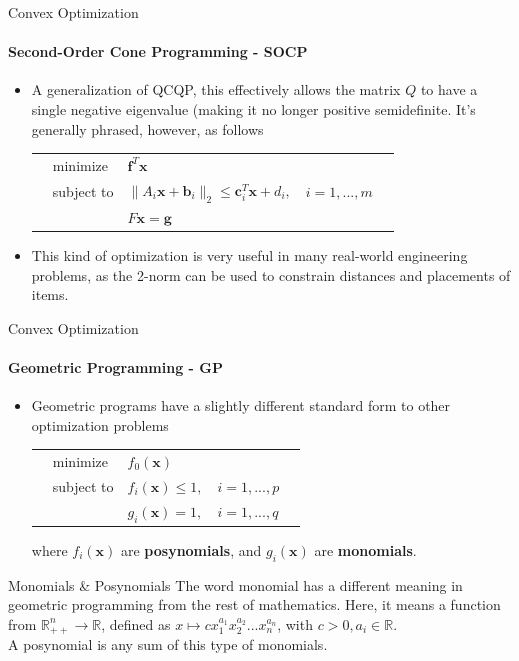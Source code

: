 \documentclass{beamer}
\renewcommand{\vec}{\mathbf}
\begin{document}
	\begin{frame}{Convex Optimization}
		\framesubtitle{Second-Order Cone Programming - SOCP}
		\begin{itemize}
			\item A generalization of QCQP, this effectively allows the matrix $Q$ to have a single negative eigenvalue (making it no longer positive semidefinite. It's generally phrased, however, as follows
			\begin{tabularx}{\textwidth}{X l l l X}
				& minimize		& $\vec{f}^T\vec{x}$	& &\\
				& subject to	& $\lVert A_i\vec{x} + \vec{b}_i\rVert_2\leq\vec{c}_i^T\vec{x} + d_i,$	& $i=1,...,m$ &\\
				&				& $F\vec{x} = \vec{g}$ & &
			\end{tabularx}
			\item This kind of optimization is very useful in many real-world engineering problems, as the 2-norm can be used to constrain distances and placements of items. 
		\end{itemize}
	\end{frame}
	
	\begin{frame}{Convex Optimization}
		\framesubtitle{Geometric Programming - GP}
		\begin{itemize}
			\item Geometric programs have a slightly different standard form to other optimization problems
			\begin{tabularx}{\textwidth}{X l l l X}
				& minimize		& $f_0(\vec{x})$	& &\\
				& subject to	& $f_i(\vec{x}) \leq 1,$	& $i=1,...,p$ &\\
				&				& $g_i(\vec{x}) = 1,$ & $i=1,...,q$ &
			\end{tabularx}
			where $f_i(\vec{x})$ are \textbf{posynomials}, and $g_i(\vec{x})$ are \textbf{monomials}.
		\end{itemize}
		\begin{block}{Monomials \& Posynomials}
			The word monomial has a different meaning in geometric programming from the rest of mathematics. Here, it means a function from $\mathbb{R}_{++}^n\to\mathbb{R}$, defined as $x\mapsto cx_1^{a_1}x_2^{a_2}...x_n^{a_n}$, with $c>0, a_i\in\mathbb{R}$.\\
			A posynomial is any sum of this type of monomials.
		\end{block}
	\end{frame}
	
\end{document}
